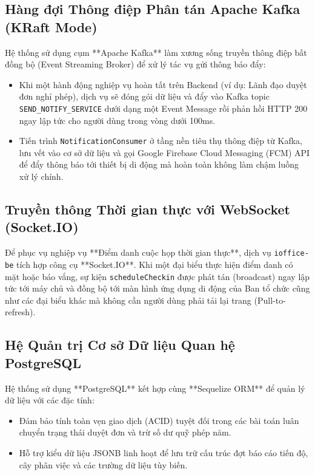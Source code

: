 \subsection{Hàng đợi Thông điệp Phân tán Apache Kafka (KRaft Mode)}
Hệ thống sử dụng cụm **Apache Kafka** làm xương sống truyền thông điệp bất đồng bộ (Event Streaming Broker) để xử lý tác vụ gửi thông báo đẩy:
\begin{itemize}
    \item Khi một hành động nghiệp vụ hoàn tất trên Backend (ví dụ: Lãnh đạo duyệt đơn nghỉ phép), dịch vụ sẽ đóng gói dữ liệu và đẩy vào Kafka topic \texttt{SEND\_NOTIFY\_SERVICE} dưới dạng một Event Message rồi phản hồi HTTP 200 ngay lập tức cho người dùng trong vòng dưới 100ms.
    \item Tiến trình \texttt{NotificationConsumer} ở tầng nền tiêu thụ thông điệp từ Kafka, lưu vết vào cơ sở dữ liệu và gọi Google Firebase Cloud Messaging (FCM) API để đẩy thông báo tới thiết bị di động mà hoàn toàn không làm chậm luồng xử lý chính.
\end{itemize}

\subsection{Truyền thông Thời gian thực với WebSocket (Socket.IO)}
Để phục vụ nghiệp vụ **Điểm danh cuộc họp thời gian thực**, dịch vụ \texttt{ioffice-be} tích hợp công cụ **Socket.IO**. Khi một đại biểu thực hiện điểm danh có mặt hoặc báo vắng, sự kiện \texttt{scheduleCheckin} được phát tán (broadcast) ngay lập tức tới máy chủ và đồng bộ tới màn hình ứng dụng di động của Ban tổ chức cũng như các đại biểu khác mà không cần người dùng phải tải lại trang (Pull-to-refresh).

\subsection{Hệ Quản trị Cơ sở Dữ liệu Quan hệ PostgreSQL}
Hệ thống sử dụng **PostgreSQL** kết hợp cùng **Sequelize ORM** để quản lý dữ liệu với các đặc tính:
\begin{itemize}
    \item Đảm bảo tính toàn vẹn giao dịch (ACID) tuyệt đối trong các bài toán luân chuyển trạng thái duyệt đơn và trừ số dư quỹ phép năm.
    \item Hỗ trợ kiểu dữ liệu JSONB linh hoạt để lưu trữ cấu trúc đợt báo cáo tiến độ, cây phân việc và các trường dữ liệu tùy biến.
\end{itemize}
